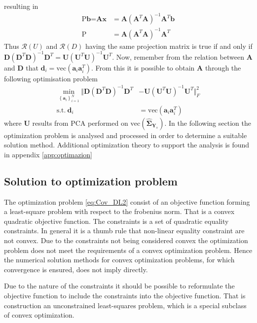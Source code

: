 resulting in
\begin{align*}
\text{P}\textbf{b} = \textbf{Ax} &= \textbf{A}(\textbf{A}^T\textbf{A})^{-1}\textbf{A}^T\textbf{b}\\
\text{P} &= \textbf{A}(\textbf{A}^T\textbf{A})^{-1}\textbf{A}^T 
\end{align*} 
Thus $\mathcal{R}(U)$ and $\mathcal{R}(D)$ having the same projection matrix is true if and only if $\textbf{D}(\textbf{D}^T\textbf{D})^{-1}\textbf{D}^T=\textbf{U}(\textbf{U}^T\textbf{U})^{-1}\textbf{U}^T$. 
Now, remember from the relation between $\textbf{A}$ and $\textbf{D}$ that $\textbf{d}_i = \text{vec}(\textbf{a}_i\textbf{a}_i^T)$. 
From this it is possible to obtain $\textbf{A}$ through the following optimisation problem 
\begin{align}
\min_{\left\{\textbf{a}_i\right\}_{i = 1}^{N}}\Vert  \textbf{D}(\textbf{D}^T\textbf{D})^{-1}\textbf{D}^T &- \textbf{U}(\textbf{U}^T\textbf{U})^{-1}\textbf{U}^T \Vert_{F}^{2} \nonumber \\
\text{s.t.} \ \textbf{d}_i&=\text{vec}(\textbf{a}_i\textbf{a}_i^T)\label{eq:Cov_DL2}
\end{align}      
where $\textbf{U}$ results from PCA performed on $\text{vec}(\widehat{\boldsymbol{\Sigma}}_{\textbf{Y}_s})$.
In the following section the optimization problem is analysed and processed in order to determine a suitable solution method. Additional optimization theory to support the analysis is found in appendix \ref{app:optimazion}  

\subsection{Solution to optimization problem}
The optimization problem \eqref{eq:Cov_DL2} consist of an objective function forming a least-square problem with respect to the frobenius norm.
That is a convex quadratic objective function.
The constraints is a set of quadratic equality constraints. In general it is a thumb rule that non-linear equality constraint are not convex.
Due to the constraints not being considered convex the optimization problem does not meet the requirements of a convex optimization problem. Hence the numerical solution methods for convex optimization problems, for which convergence is ensured, does not imply directly. 

Due to the nature of the constraints it should be possible to reformulate the objective function to include the constraints into the objective function. That is construction an unconstrained least-squares problem, which is a special subclass of convex optimization\cite{cvxbook}.


